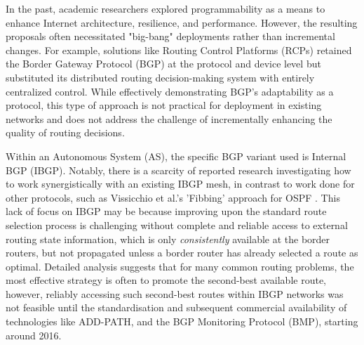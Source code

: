 In the past, academic researchers explored programmability as a means to enhance Internet architecture, resilience, and performance. However, the resulting proposals often necessitated "big-bang" deployments rather than incremental changes. For example, solutions like Routing Control Platforms (RCPs) \cite{Feamster2004} retained the Border Gateway Protocol (BGP) at the protocol and device level but substituted its distributed routing decision-making system with entirely centralized control. While effectively demonstrating BGP's adaptability as a protocol, this type of approach is not practical for deployment in existing networks and does not address the challenge of incrementally enhancing the quality of routing decisions.

Within an Autonomous System (AS), the specific BGP variant used is Internal BGP (IBGP). Notably, there is a scarcity of reported research investigating how to work synergistically with an existing IBGP mesh, in contrast to work done for other protocols, such as Vissicchio et al.'s 'Fibbing' approach for OSPF \cite{Vissicchio2015c}. This lack of focus on IBGP may be because improving upon the standard route selection process is challenging without complete and reliable access to external routing state information, which is only \textit{consistently} available at the border routers, but not propagated unless a border router has already selected a route as optimal. Detailed analysis suggests that for many common routing problems, the most effective strategy is often to promote the second-best available route, however, reliably accessing such second-best routes within IBGP networks was not feasible until the standardisation and subsequent commercial availability of technologies like ADD-PATH, and the BGP Monitoring Protocol (BMP), starting around 2016.
\medskip


